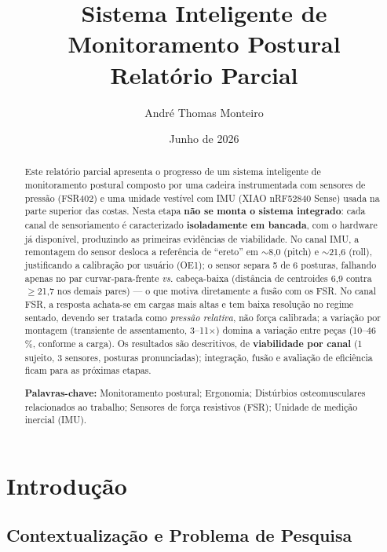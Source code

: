 \documentclass[12pt,a4paper]{article}
\title{\textbf{Sistema Inteligente de Monitoramento Postural}\\[0.3em]
\large Relatório Parcial}
\author{André Thomas Monteiro}
\date{Junho de 2026}
\begin{document}
\maketitle

\begin{abstract}
\noindent
Este relatório parcial apresenta o progresso de um sistema inteligente de
monitoramento postural composto por uma cadeira instrumentada com sensores de
pressão (FSR402) e uma unidade vestível com IMU (XIAO nRF52840 Sense) usada na
parte superior das costas. Nesta etapa \textbf{não se monta o sistema integrado}:
cada canal de sensoriamento é caracterizado \textbf{isoladamente em bancada}, com
o hardware já disponível, produzindo as primeiras evidências de viabilidade. No
canal IMU, a remontagem do sensor desloca a referência de ``ereto'' em
$\sim$8{,}0\degree{} (pitch) e $\sim$21{,}6\degree{} (roll), justificando a
calibração por usuário (OE1); o sensor separa 5 de 6 posturas, falhando apenas no
par curvar-para-frente {\itshape vs.} cabeça-baixa (distância de centroides
6{,}9\degree{} contra $\geq$21{,}7\degree{} nos demais pares) --- o que motiva
diretamente a fusão com os FSR. No canal FSR, a resposta achata-se em cargas mais
altas e tem baixa resolução no regime sentado, devendo ser tratada como
\emph{pressão relativa}, não força calibrada; a variação por montagem
(transiente de assentamento, 3--11$\times$) domina a variação entre peças
(10--46\,\%, conforme a carga). Os resultados são descritivos, de \textbf{viabilidade por
canal} (1 sujeito, 3 sensores, posturas pronunciadas); integração, fusão e
avaliação de eficiência ficam para as próximas etapas.

\vspace{0.8em}
\noindent\textbf{Palavras-chave:} Monitoramento postural; Ergonomia; Distúrbios
osteomusculares relacionados ao trabalho; Sensores de força resistivos (FSR);
Unidade de medição inercial (IMU).
\end{abstract}

\section{Introdução}

\subsection{Contextualização e Problema de Pesquisa}
\end{document}
